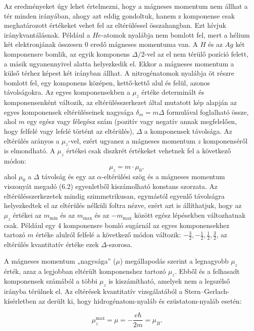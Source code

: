 \documentclass[../main.tex]{subfiles}
\begin{document}
Az eredményeket úgy lehet értelmezni, hogy a mágneses momentum
nem állhat a tér minden irányában, ahogy azt eddig gondoltuk, hanem
z komponense csak meghatározott értékeket vehet fel az eltérüléssel összahangban.
Ezt hívjuk iránykvantálásnak.
Például a $He$-atomok nyalábja nem bomlott fel, mert a hélium két
elektronjának összesen $0$ eredő mágneses momentuma van.
A $H$ és az $Ag$ két komponensre bomlik, az egyik komponens $\Delta/2$-vel
az el nem térülő pozíció felett, a másik ugyanennyivel alatta helyezkedik el.
Ekkor a mágneses momentum a külső térhez képest két irányban állhat.
A nitrogénatomok nyalábja öt részre bomlott fel, egy komponens középen,
kettő-kettő alul és felül, azonos távolságokra.
Az egyes komponensekben a $\mu_z$ értéke determinált és komponensenként
változik, az eltérülésszerkezet által mutatott kép alapján az egyes
komponensek eltérüléseinek nagysága $\delta_m=m\Delta$ formulával
foglalható össze, ahol $m$ egy egész vagy félegész szám (pozitív vagy
negatív annak megfelelően, hogy felfelé vagy lefelé történt az eltérülés),
$\Delta$ a komponensek távolsága.
Az eltérülés arányos a $\mu_z$-vel, ezért ugyanez a mágneses
momentum $z$ komponenséről is elmondható.
A $\mu_z$ értékei csak diszkrét értékeket vehetnek fel a következő módon:
\[
\mu_z = m\cdot\mu_0,
\]
ahol $\mu_0$ a $\Delta$ távolság és egy az $\alpha$-eltérülési szög és a
mágneses momentum viszonyát megadó (6.2) egyenletből kiszámolható
konstans szorzata.
Az eltérülésszerkezetek mindig szimmetrikusan, egymástól egyenlő
távolságra helyezkedtek el az eltérülés nélküli foltra nézve, ezért azt is
állíthatjuk, hogy az $\mu_z$ értékei az $m_{\min}$ és az $m_{\max}$
és az $-m_{\max}$ között egész lépésekben változhatnak csak.
Például egy 4 komponensre bomló sugárnál az egyes komponensekhez tartozó $m$ értéke alulról felfelé a következő
módon változik: $-\tfrac{3}{2}, -\tfrac{1}{2}, \tfrac{1}{2}, \tfrac{3}{2}$,
az eltérülés kvantitatív értéke ezek $\Delta$-szorosa.

A mágneses momentum „nagysága” ($\mu$) megállapodás szerint a legnagyobb
$\mu_z$ érték, azaz a legjobban eltérült komponenshez tartozó $\mu_z$.
Ebből és a felhasadt komponensek számából a többi $\mu_z$ is kiszámítható,
amelyek nem a legszélső irányba térülnek el.
Az eltérések kvantitatív vizsgálatából a Stern–Gerlach-kísérletben az
derült ki, hogy hidrogénatom-nyaláb és ezüstatom-nyaláb esetén:

\begin{equation}
\mu_z^{\max} = \mu = -\frac{e\hbar}{2m} = \mu_B.
\end{equation}
\end{document}
